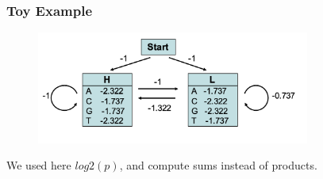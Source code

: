 \documentclass{beamer}
\begin{document}
\begin{frame}
        \frametitle{Toy Example}
        
        \begin{figure}[T]
            \includegraphics[width=0.8\textwidth]{img/9.png}
            \end{figure}
            We used here $log2(p)$, and compute sums instead of products.
        \end{frame}
\end{document}
